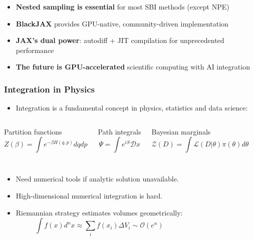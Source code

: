 \documentclass[aspectratio=169]{beamer}
\begin{document}
\begin{frame}
    \begin{itemize}
        \item \textbf{Nested sampling is essential} for most SBI methods (except NPE)
        \item \textbf{BlackJAX} provides GPU-native, community-driven implementation
        \item \textbf{JAX's dual power}: autodiff + JIT compilation for unprecedented performance
        \item \textbf{The future is GPU-accelerated} scientific computing with AI integration
    \end{itemize}
\end{frame}

\appendix

\begin{frame}
    \frametitle{Integration in Physics}
    \begin{itemize}
        \item Integration is a fundamental concept in physics, statistics and data science:
    \end{itemize}
    \begin{columns}
        \begin{block}{Partition functions}
            \vspace{-11pt}
            \[ Z(\beta) = \int e^{-\beta H(q,p)} dq dp \]
        \end{block}
        \begin{block}{Path integrals}
            \[ \Psi = \int e^{i S} \mathcal{D}x \]
        \end{block}
        \begin{block}{Bayesian marginals}
            \vspace{-11pt}
            \[ \mathcal{Z}(D) = \int \mathcal{L}(D|\theta) \pi(\theta) d\theta \]
        \end{block}
    \end{columns}
    \begin{columns}
        \begin{itemize}
            \item Need numerical tools if analytic solution unavailable.
            \item High-dimensional numerical integration is hard.
            \item Riemannian strategy estimates volumes geometrically:
                \[ \int f(x) d^nx \approx \sum_i f(x_i) \Delta V_i \sim \mathcal{O}(e^n) \]

\end{itemize}
\end{columns}
\end{frame}
\end{document}
